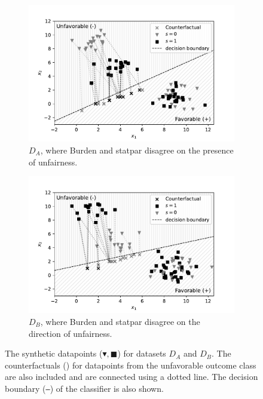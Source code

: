 \documentclass[runningheads]{llncs}
\begin{document}
\begin{figure}
    \centering
    \begin{subfigure}{0.49\textwidth}
        \includegraphics[width=\textwidth]{img/syndata-A-bw}
        \caption{$D_A$, where \gls{Burden} and \gls{statpar} disagree on the
        presence of unfairness.}
        \label{fig:syndatafavor}
    \end{subfigure}
    \begin{subfigure}{0.49\textwidth}
        \includegraphics[width=\textwidth]{img/syndata-B-bw}
        \caption{$D_B$, where \gls{Burden} and \gls{statpar} disagree on the
        direction of unfairness.}
        \label{fig:syndataunfavor}
    \end{subfigure}
    \caption{The synthetic datapoints ($\blacktriangledown,\blacksquare$) for
    datasets $D_A$ and $D_B$. The counterfactuals (\texttimes) for datapoints
    from the unfavorable outcome class are also included and are connected
    using a dotted line. The decision boundary (\texttt{---}) of the classifier
    is also shown.}
    \label{fig:syndataplot}
\end{figure}
\end{document}
